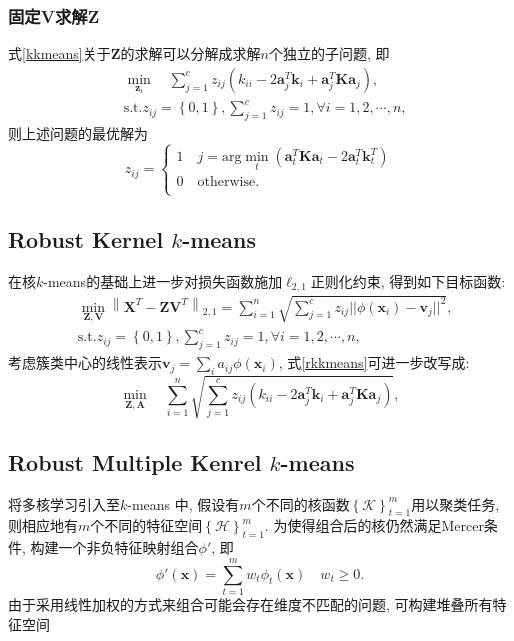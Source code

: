 \documentclass[lang=cn,10pt]{gorgeousnbook}
\numberwithin{equation}{section}%
\numberwithin{figure}{section}%
\begin{document}
\subsubsection{固定\textbf{V}求解\textbf{Z}}
式\eqref{kkmeans}关于$\bm{Z}$的求解可以分解成求解$n$个独立的子问题, 即
\begin{equation}
\begin{aligned}
&\min_{\boldsymbol{z}_i}\quad{\sum_{j=1}^cz_{ij}({k}_{ii}-2\boldsymbol{a}_j^T{\boldsymbol{k}}_i+\boldsymbol{a}_j^T{\bm{K}}\boldsymbol{a}_j)},\\
&\mathrm{s}.\mathrm{t}. z_{ij}=\left\{ 0,1 \right\} ,\sum_{j=1}^c{z_{ij}=1,\forall i=1,2,\cdots ,n,}
\end{aligned}
\end{equation}
则上述问题的最优解为
\begin{equation}
z_{ij}=\left\{ \begin{array}{l}
	1 \quad j=\mathrm{arg}\min _t\left( \boldsymbol{a}_{t}^{T}\boldsymbol{Ka}_t-2\boldsymbol{a}_{t}^{T}\boldsymbol{k}_{t}^{T} \right)\\
	0  \quad \mathrm{otherwise}.\\
\end{array} \right. 
\end{equation}

\subsection{Robust Kernel $k$-means}
在核$k$-means的基础上进一步对损失函数施加$\ell_{2,1}$正则化约束, 得到如下目标函数:
\begin{equation}
\begin{aligned}
&\min_{\bm{Z},\bm{V}}\left\|\bm{X}^T-\bm{ZV}^T\right\|_{2,1} =\sum_{i=1}^n\sqrt{\sum_{j=1}^cz_{ij}||\phi(\boldsymbol{x}_i)-\boldsymbol{v}_j||^2},\\
&\mathrm{s}.\mathrm{t}. z_{ij}=\left\{ 0,1 \right\} ,\sum_{j=1}^c{z_{ij}=1,\forall i=1,2,\cdots ,n,}
\end{aligned}\label{rkkmeans}
\end{equation}
考虑簇类中心的线性表示$\bm{v}_j = \sum_ia_{ij}\phi(\bm{x}_i)$, 式\eqref{rkkmeans}可进一步改写成:
\begin{equation}
\min\limits_{\bm{Z},\bm{A}}\quad\sum\limits_{i=1}^n\sqrt{\sum\limits_{j=1}^cz_{ij}(k_{ii}-2\boldsymbol{a}_j^T\boldsymbol{k}_i+\boldsymbol{a}_j^T\bm{K}\boldsymbol{a}_j)},
\end{equation}

\subsection{Robust Multiple Kenrel $k$-means}
将多核学习引入至$k$-means 中, 假设有$m$个不同的核函数$\left\{\mathcal{K}\right\}_{t=1}^m$用以聚类任务, 则相应地有$m$个不同的特征空间$\left\{\mathcal{H}\right\}_{t=1}^m$. 为使得组合后的核仍然满足Mercer条件, 构建一个非负特征映射组合$\phi'$, 即
\begin{equation}
\phi'(\boldsymbol{x})=\sum_{t=1}^mw_t\phi_t(\boldsymbol{x})\quad w_t\geq0.
\end{equation}
由于采用线性加权的方式来组合可能会存在维度不匹配的问题, 可构建堆叠所有特征空间
\end{document}
